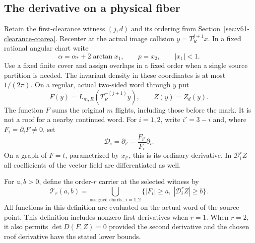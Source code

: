\subsection{The derivative on a physical fiber}
Retain the first-clearance witness $(j,d)$ and its ordering from
Section~\ref{sec:v61-clearance-coarea}. Recenter at the actual image
collision $y=T_R^{j+1}x$. In a fixed rational angular chart write
\[
 \alpha=\alpha_*+2\arctan x_1,\qquad p=x_2,\qquad |x_1|<1.
\]
Use a fixed finite cover and assign overlaps in a fixed order when a
single source partition is needed. The invariant density in these
coordinates is at most $1/(2\pi)$. On a regular, actual two-sided word
through $y$ put
\begin{equation}\label{eq:v62-fiber-objects}
 F(y)=L_{m,R}(T_R^{-(j+1)}y),\qquad Z(y)=Z_d(y).
\end{equation}
The function $F$ sums the original $m$ flights, including those before
the mark. It is not a roof for a nearby continued word. For $i=1,2$,
write $i'=3-i$ and, where $F_i=\partial_iF\ne0$, set
\begin{equation}\label{eq:v62-fiber-derivative}
 \mathscr D_i=\partial_{i'}-\frac{F_{i'}}{F_i}\partial_i.
\end{equation}
On a graph of $F=t$, parametrized by $x_{i'}$, this is its ordinary
derivative. In $\mathscr D_i^rZ$ all coefficients of the vector field
are differentiated as well.

For $a,b>0$, define the order-$r$ carrier at the selected witness by
\begin{equation}\label{eq:v62-type-carrier}
 \mathcal T_r(a,b)=
 \bigcup_{\text{assigned charts},\ i=1,2}
       \{|F_i|\ge a,\ |\mathscr D_i^rZ|\ge b\}.
\end{equation}
All functions in this definition are evaluated on the actual word of
the source point. This definition includes nonzero first derivatives
when $r=1$. When $r=2$, it also permits $\det D(F,Z)=0$ provided the
second derivative and the chosen roof derivative have the stated
lower bounds.

